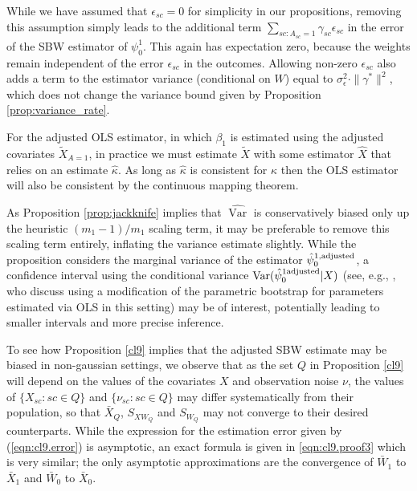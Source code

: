 \begin{remark}
    While we have assumed that $\epsilon_{sc}=0$ for simplicity in our propositions, removing this assumption simply leads to the additional term $\sum_{sc: A_{sc} = 1}\gamma_{sc}\epsilon_{sc}$ in the error of the SBW estimator of $\psi_0^1$. This again has expectation zero, because the weights remain independent of the error $\epsilon_{sc}$ in the outcomes. Allowing non-zero $\epsilon_{sc}$ also adds a term to the estimator variance (conditional on $W$) equal to $\sigma^2_{\epsilon}\cdot \|\gamma^*\|^2$,    which does not change the variance bound given by Proposition \ref{prop:variance_rate}.
\end{remark}

\begin{remark}
    For the adjusted OLS estimator, in which $\beta_1$ is estimated using the adjusted covariates $\tilde{X}_{A=1}$, in practice we must estimate $\tilde{X}$ with some estimator $\hat{X}$ that relies on an estimate $\hat{\kappa}$. As long as $\hat{\kappa}$ is consistent for $\kappa$ then the OLS estimator will also be consistent by the continuous mapping theorem.
\end{remark}

\begin{remark}
As Proposition \ref{prop:jackknife} implies that $\hat{\operatorname{Var}}$ is conservatively biased only up the heuristic $(m_1-1)/m_1$ scaling term, it may be preferable to remove this scaling term entirely, inflating the variance estimate slightly. While the proposition considers the marginal variance of the estimator $\hat{\psi}_0^{1,\textup{adjusted}}$, a confidence interval using the conditional variance $\operatorname{Var}(\hat{\psi}_0^{1 \textup{adjusted}}|X)$ (see, e.g., \citet{buonaccorsi2010measurement}, who discuss using a modification of the parametric bootstrap for parameters estimated via OLS in this setting) may be of interest, potentially leading to smaller intervals and more precise inference. 
\end{remark}


\begin{remark}
To see how Proposition \ref{cl9} implies that the adjusted SBW estimate may be biased in non-gaussian settings, we observe that as the set $Q$ in Proposition \ref{cl9} will depend on the values of the covariates $X$ and observation noise $\nu$, the values of $\{X_{sc}: sc \in Q\}$ and $\{\nu_{sc}: sc \in Q\}$ may differ systematically from their population, so that $\bar{X}_Q$, $S_{XW_Q}$ and $S_{W_Q}$ may not converge to their desired counterparts. While the expression for the estimation error given by (\ref{eqn:cl9.error}) is asymptotic, an exact formula is given in \eqref{eqn:cl9.proof3} which is very similar; the only asymptotic approximations are the convergence of $\bar{W}_1$ to $\bar{X}_1$ and $\bar{W}_0$ to $\bar{X}_0$. 
\end{remark}

